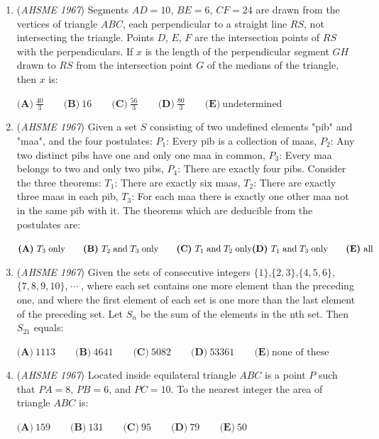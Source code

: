 \begin{enumerate}
 $\textbf{(A)}\ 0\qquad \textbf{(B)}\ 91\qquad \textbf{(C)}\ 133\qquad \textbf{(D)}\ 195\qquad \textbf{(E)}\ 211$


	\item (\textit{AHSME 1967}) Segments $AD=10$, $BE=6$, $CF=24$ are drawn from the vertices of triangle $ABC$, each perpendicular to a straight line $RS$, not intersecting the triangle.  Points $D$, $E$, $F$ are the intersection points of $RS$ with the perpendiculars.  If $x$ is the length of the perpendicular segment $GH$ drawn to $RS$ from the intersection point $G$ of the medians of the triangle, then $x$ is:


 $\textbf{(A)}\ \frac{40}{3}\qquad \textbf{(B)}\ 16\qquad \textbf{(C)}\ \frac{56}{3}\qquad \textbf{(D)}\ \frac{80}{3}\qquad \textbf{(E)}\ \text{undetermined}$


	\item (\textit{AHSME 1967}) Given a set $S$ consisting of two undefined elements "pib" and "maa", and the four postulates: $P_1$: Every pib is a collection of maas, $P_2$: Any two distinct pibs have one and only one maa in common, $P_3$: Every maa belongs to two and only two pibs, $P_4$: There are exactly four pibs.  Consider the three theorems: $T_1$: There are exactly six maas, $T_2$: There are exactly three maas in each pib, $T_3$: For each maa there is exactly one other maa not in the same pib with it.  The theorems which are deducible from the postulates are:


 $\textbf{(A)}\ T_3 \; \text{only}\qquad \textbf{(B)}\ T_2 \; \text{and} \; T_3 \; \text{only} \qquad \textbf{(C)}\ T_1 \; \text{and} \; T_2 \; \text{only}\\ \textbf{(D)}\ T_1 \; \text{and} \; T_3 \; \text{only}\qquad \textbf{(E)}\ \text{all}$


	\item (\textit{AHSME 1967}) Given the sets of consecutive integers $\{1\}$,$\{2, 3\}$,$\{4,5,6\}$,$\{7,8,9,10\}$,$\; \cdots \;$, where each set contains one more element than the preceding one, and where the first element of each set is one more than the last element of the preceding set.  Let $S_n$ be the sum of the elements in the nth set.  Then $S_{21}$ equals:


 $\textbf{(A)}\ 1113\qquad \textbf{(B)}\ 4641 \qquad \textbf{(C)}\ 5082\qquad \textbf{(D)}\ 53361\qquad \textbf{(E)}\ \text{none of these}$


	\item (\textit{AHSME 1967}) Located inside equilateral triangle $ABC$ is a point $P$ such that $PA=8$, $PB=6$, and $PC=10$.  To the nearest integer the area of triangle $ABC$ is:


 $\textbf{(A)}\ 159\qquad \textbf{(B)}\ 131\qquad \textbf{(C)}\ 95\qquad \textbf{(D)}\ 79\qquad \textbf{(E)}\ 50$


\end{enumerate}